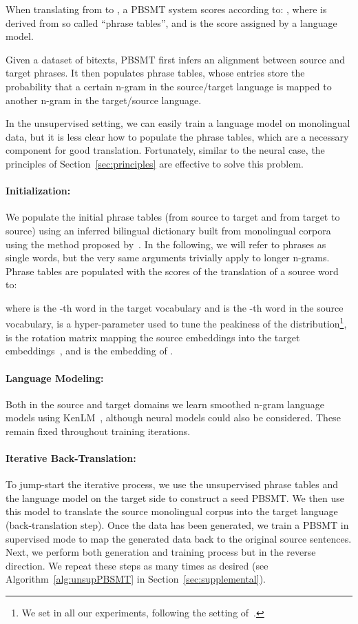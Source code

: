 \documentclass[11pt,a4paper]{article}
\begin{document}
When translating from  to , a PBSMT system scores  according to: , where   is derived from so called ``phrase tables'', and  is the score assigned by a language model.

Given a dataset of bitexts, PBSMT first infers an alignment between source and target phrases. It  then populates phrase tables, whose entries store the probability that a certain n-gram in the source/target language is mapped to another n-gram in the target/source language.
 

In the unsupervised setting, we can easily train a language model on monolingual data, but it is less clear how to populate the phrase tables, which are a necessary component for good translation. Fortunately, similar to the neural case, the principles of Section~\ref{sec:principles} are effective to solve this problem.

\paragraph{Initialization: }
We populate the initial phrase tables (from source to target and from target to source) using an inferred bilingual dictionary built from monolingual corpora using the method proposed by~\citet{wordalign17}. In the following, we will refer to phrases as single words, but the very same arguments trivially apply to longer n-grams. Phrase tables are populated with the scores of the translation of a source word to:

where  is the -th word in the target vocabulary and  is the -th word in the source vocabulary,  is a hyper-parameter used to tune the peakiness of the distribution\footnote{We set  in all our experiments, following the setting of~\citet{inverted-sm}.},  is the rotation matrix mapping the source embeddings into the target embeddings~\cite{wordalign17}, and  is the embedding of . 

\paragraph{Language Modeling: }
Both in the source and target domains we learn smoothed n-gram language models using KenLM~\cite{heafield2011kenlm}, although neural models could also be considered. These remain fixed throughout training iterations.

\paragraph{Iterative Back-Translation: }
To jump-start the iterative process, we use the unsupervised phrase tables and the language model on the target side to construct a seed PBSMT. We then use this model to translate the source monolingual corpus into the target language (back-translation step). Once the data has been generated, we train a PBSMT in supervised mode to map the generated data back to the original source sentences. Next, we perform both generation and training process but in the reverse direction. We repeat these steps as many times as desired (see Algorithm~\ref{alg:unsupPBSMT} in Section~\ref{sec:supplemental}).
\end{document}
